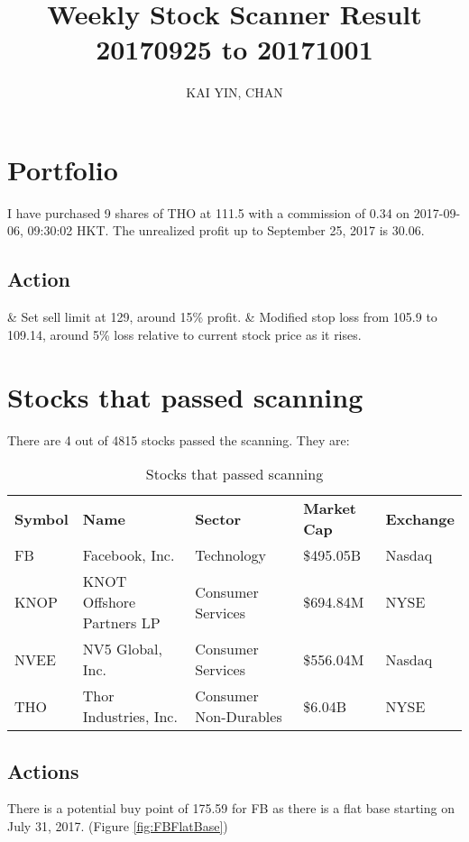 \documentclass{article}
\begin{document}
\title{Weekly Stock Scanner Result \\ 20170925 to 20171001}
\author{KAI YIN, CHAN}
\maketitle

\section{Portfolio}
I have purchased 9 shares of THO at 111.5 with a commission of 0.34 on 2017-09-06, 09:30:02 HKT. The unrealized profit up to September 25, 2017 is 30.06.

\subsection{Action}
\begin{easylist}
& Set sell limit at 129, around 15\% profit.
& Modified stop loss from 105.9 to 109.14, around 5\% loss relative to current stock price as it rises.
\end{easylist}

\section{Stocks that passed scanning}

There are 4 out of 4815 stocks passed the scanning.  They are:
\begin{table}[htbp]
  \caption{Stocks that passed scanning}
    \begin{tabular}{lllll}
    \textbf{Symbol} & \textbf{Name} & \textbf{Sector} & \textbf{Market Cap} & \textbf{Exchange} \\
    FB    & Facebook, Inc. & Technology & \$495.05B & Nasdaq \\
    KNOP  & KNOT Offshore Partners LP & Consumer Services & \$694.84M & NYSE \\
    NVEE  & NV5 Global, Inc. & Consumer Services & \$556.04M & Nasdaq \\
    THO   & Thor Industries, Inc. & Consumer Non-Durables & \$6.04B & NYSE \\
    \end{tabular}%
  \label{tab:addlabel}%
\end{table}%

\subsection{Actions}
There is a potential buy point of 175.59 for FB as there is a flat base starting on July 31, 2017. (Figure \ref{fig:FBFlatBase})
\end{document}
